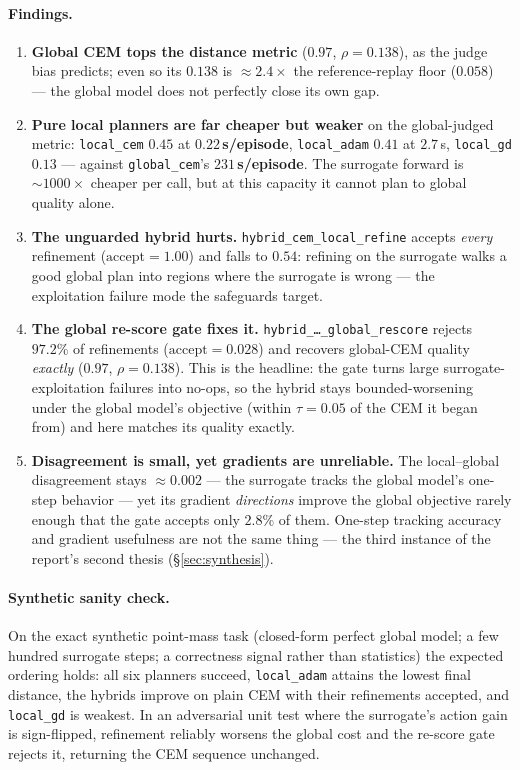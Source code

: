 \documentclass[11pt,a4paper]{article}
\begin{document}
\paragraph{Findings.}
\begin{enumerate}[leftmargin=1.5em,itemsep=2pt]
\item \textbf{Global CEM tops the distance metric} ($0.97$, $\rho{=}0.138$), as
the judge bias predicts; even so its $0.138$ is ${\approx}2.4\times$ the
reference-replay floor ($0.058$) --- the global model does not perfectly close
its own gap.
\item \textbf{Pure local planners are far cheaper but weaker} on the
global-judged metric: \texttt{local\_cem} $0.45$ at \textbf{$0.22$\,s/episode},
\texttt{local\_adam} $0.41$ at $2.7$\,s, \texttt{local\_gd} $0.13$ --- against
\texttt{global\_cem}'s \textbf{$231$\,s/episode}. The surrogate forward is
${\sim}1000\times$ cheaper per call, but at this capacity it cannot plan to
global quality alone.
\item \textbf{The unguarded hybrid hurts.} \texttt{hybrid\_cem\_local\_refine}
accepts \emph{every} refinement ($\text{accept}{=}1.00$) and falls to $0.54$:
refining on the surrogate walks a good global plan into regions where the
surrogate is wrong --- the exploitation failure mode the safeguards target.
\item \textbf{The global re-score gate fixes it.}
\texttt{hybrid\_\dots\_global\_rescore} rejects $97.2\%$ of refinements
($\text{accept}{=}0.028$) and recovers global-CEM quality \emph{exactly}
($0.97$, $\rho{=}0.138$). This is the headline: the gate turns large
surrogate-exploitation failures into no-ops, so the hybrid stays bounded-worsening
under the global model's objective (within $\tau{=}0.05$ of the CEM it began
from) and here matches its quality exactly.
\item \textbf{Disagreement is small, yet gradients are unreliable.} The
local--global disagreement stays ${\approx}0.002$ --- the surrogate tracks the
global model's one-step behavior --- yet its gradient \emph{directions} improve
the global objective rarely enough that the gate accepts only $2.8\%$ of them.
One-step tracking accuracy and gradient usefulness are not the same thing --- the
third instance of the report's second thesis (\S\ref{sec:synthesis}).
\end{enumerate}

\paragraph{Synthetic sanity check.} On the exact synthetic point-mass task
(closed-form perfect global model; a few hundred surrogate steps; a correctness
signal rather than statistics) the expected ordering holds: all six planners
succeed, \texttt{local\_adam} attains the lowest final distance, the hybrids
improve on plain CEM with their refinements accepted, and \texttt{local\_gd} is
weakest. In an adversarial unit test where the surrogate's action gain is
sign-flipped, refinement reliably worsens the global cost and the re-score gate
rejects it, returning the CEM sequence unchanged.
\end{document}
